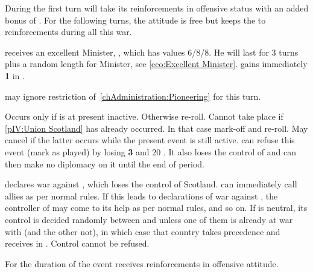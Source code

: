 \phadm
\aparag During the first turn \paysDanemark will take its reinforcements in
offensive status with an added bonus of . For the following turns,
the attitude is free but \paysDanemark keeps the  to reinforcements
during all this war.





\phevnt
\aparag \SUE receives an excellent Minister, , which has
values 6/8/8. He will last for 3 turns plus a random length for Minister, see
\ref{eco:Excellent Minister}.
\aparag \SUE gains immediately {\bf 1} in \STAB.

\phadm
\aparag \SUE may ignore restriction of~\ref{chAdministration:Pioneering} for
this turn.





\condition{}
\aparag Occurs only if \paysecosse is at present inactive. Otherwise re-roll.
\aparag Cannot take place if \ref{pIV:Union Scotland} has already occurred.
In that case mark-off and re-roll. May cancel  if
the latter occurs while the present event is still active.
\aparag \ENG can refuse this event (mark as played) by losing {\bf 3} \STAB
and 20 \VP.  It also loses the control of \paysecosse and can then make no
diplomacy on it until the end of period.

\phevnt
\aparag \paysecosse declares war against \ENG, which loses the control of
Scotland.
\aparag \ENG can immediately call allies as per normal rules.
\aparag If this leads to declarations of war against \paysecosse, the
controller of \paysecosse may come to its help as per normal rules, and so on.
\aparag If \paysecosse is neutral, its control is decided randomly between
\SPA and \FRA unless one of them is already at war with \ENG (and the other
not), in which case that country takes precedence and receives \paysecosse in
\EG. Control cannot be refused.

\phadm
\aparag For the duration of the event \paysecosse receives reinforcements in
offensive attitude.




